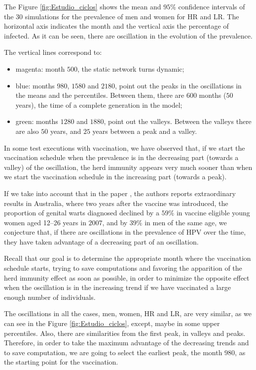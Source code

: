 The Figure \ref{fig:Estudio_ciclos} shows the mean and $95\%$ confidence intervals of the $30$ simulations for the prevalence of men and women for HR and LR. The horizontal axis indicates the month and the vertical axis the percentage of infected. As it can be seen, there are oscillation in the evolution of the prevalence.

The vertical lines correspond to:
\begin{itemize}
	\item magenta: month $500$, the static network turns dynamic;
	\item blue: months $980$, $1580$ and $2180$, point out the peaks in the oscillations in the means and the percentiles. Between them, there are $600$ months ($50$ years), the time of a complete generation in the model;
	\item green: months $1280$  and $1880$, point out the valleys. Between the valleys there are also $50$ years, and $25$ years between a peak and a valley. 	
\end{itemize}

In some test executions with vaccination, we have observed that, if we start the vaccination schedule when the prevalence is in the decreasing part (towards a valley) of the oscillation, the herd immunity appears very much sooner than when we start the vaccination schedule in the increasing part (towards a peak).

If we take into account that in the paper \cite{ali2013genital}, the authors reports extraordinary results in Australia, where two years after the vaccine was introduced, the proportion of genital warts diagnosed declined by a $59\%$ in vaccine eligible young women aged 12--26 years in $2007$, and by $39\%$ in men of the same age, we conjecture that, if there are oscillations in the prevalence of HPV over the time, they have taken advantage of a decreasing part of an oscillation.

Recall that our goal is to determine the appropriate month where the vaccination schedule starts, trying to save computations and favoring the apparition of the herd immunity effect as soon as possible, in order to minimize the opposite effect when the oscillation is in the increasing trend if we have vaccinated a large enough number of individuals.

The oscillations in all the cases, men, women, HR and LR, are very similar, as we can see in the Figure \ref{fig:Estudio_ciclos}, except, maybe in some upper percentiles. Also, there are similarities from the first peak, in valleys and peaks. Therefore, in order to take the maximum advantage of the decreasing trends and to save computation, we are going to select the earliest peak, the month $980$, as the starting point for the vaccination.

